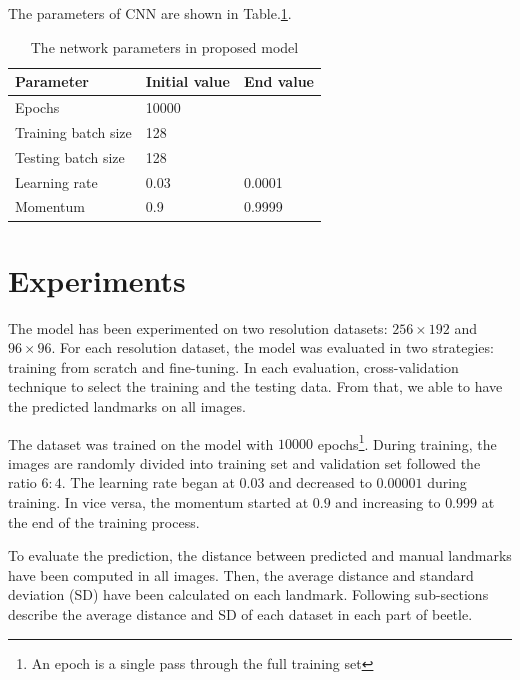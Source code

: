 \documentclass[12pt,a4paper]{article}
\begin{document}
The parameters of CNN are shown in Table.\ref{model2parameters}.
\begin{table}[h!]
	\centering
	\begin{tabular}{l l l}
	Parameter & Initial value & End value \\ \hline
	Epochs & 10000 &  \\ \hline
	Training batch size & 128 & \\ \hline
	Testing batch size & 128 & \\ \hline
	Learning rate & 0.03 & 0.0001 \\ \hline
	Momentum & 0.9 & 0.9999 \\ \hline
	\end{tabular}
	\caption{The network parameters in proposed model}
	\label{model2parameters}
\end{table}
\section{Experiments}
The model has been experimented on two resolution datasets: $256 \times 192$ and $96 \times 96$. For each resolution dataset, the model was evaluated in two strategies: training from scratch and fine-tuning. In each evaluation, cross-validation technique to select the training and the testing data. From that, we able to have the predicted landmarks on all images.

The dataset was trained on the model with $10000$ epochs\footnote{An epoch is a single pass through the full training set}. During training, the images are randomly divided into training set and validation set followed the ratio $6:4$. The learning rate began at $0.03$ and decreased to $0.00001$ during training. In vice versa, the momentum started at $0.9$ and increasing to $0.999$ at the end of the training process. 

To evaluate the prediction, the distance between predicted and manual landmarks have been computed in all images. Then, the average distance and standard deviation (SD) have been calculated on each landmark. Following sub-sections describe the average distance and SD of each dataset in each part of beetle.
\end{document}
